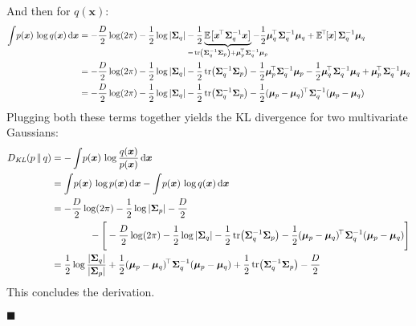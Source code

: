 \documentclass[11pt, a4paper]{scrartcl}
\newcommand{\E}{\mathbb{E}}
\newcommand{\KL}{D_\mathit{KL}}
\newcommand{\transposed}{{\!\top\!}}
\renewcommand{\vec}[1]{\bm{#1}}
\newcommand{\mat}[1]{\bm{\mathrm{#1}}}
\newcommand{\eot}{\hfill\(\blacksquare\)}
\begin{document}
			And then for \( q(\vec{x}) \):
			\begin{align}
				\int\! p(\vec{x}) \, \log q(\vec{x}) \dd{\vec{x}}
					&= -\frac{D}{2} \log(2\pi) - \frac{1}{2} \log \, \lvert \mat{\Sigma}_q \rvert - \frac{1}{2} \underbrace{\E\big[ \vec{x}^\transposed\, \mat{\Sigma}_q^{-1} \vec{x} \big]}_{\mathclap{=\, \tr(\mat{\Sigma}_q^{-1} \mat{\Sigma}_p) + \vec{\mu}_p^{\transposed\,} \mat{\Sigma}_q^{-1} \vec{\mu}_p}} - \frac{1}{2} \vec{\mu}_q^\transposed\, \mat{\Sigma}_q^{-1} \vec{\mu}_q + \E^\transposed[\vec{x}]\, \mat{\Sigma}_q^{-1} \vec{\mu}_q \\
					&= -\frac{D}{2} \log(2\pi) - \frac{1}{2} \log \, \lvert \mat{\Sigma}_q \rvert - \frac{1}{2} \tr(\mat{\Sigma}_q^{-1} \mat{\Sigma}_p) - \frac{1}{2} \vec{\mu}_p^{\transposed\,} \mat{\Sigma}_q^{-1} \vec{\mu}_p - \frac{1}{2} \vec{\mu}_q^\transposed\, \mat{\Sigma}_q^{-1} \vec{\mu}_q + \vec{\mu}_p^\transposed\, \mat{\Sigma}_q^{-1} \vec{\mu}_q \\
					&= -\frac{D}{2} \log(2\pi) - \frac{1}{2} \log \, \lvert \mat{\Sigma}_q \rvert - \frac{1}{2} \tr(\mat{\Sigma}_q^{-1} \mat{\Sigma}_p) - \frac{1}{2} (\vec{\mu}_p - \vec{\mu}_q)^\transposed\, \mat{\Sigma}_q^{-1} (\vec{\mu}_p - \vec{\mu}_q)
			\end{align}
			Plugging both these terms together yields the KL divergence for two multivariate Gaussians:
			\begin{align}
				\KL(p \,\Vert\, q)
					&= -\int\! p(\vec{x}) \, \log \frac{q(\vec{x})}{p(\vec{x})} \dd{\vec{x}} \\
					&= \int\! p(\vec{x}) \, \log p(\vec{x}) \dd{\vec{x}} - \int\! p(\vec{x}) \, \log q(\vec{x}) \dd{\vec{x}} \\
					&= -\frac{D}{2} \log(2\pi) - \frac{1}{2} \log \, \lvert \mat{\Sigma}_p \rvert - \frac{D}{2} \\&\qquad\qquad
						- \Bigg[ -\frac{D}{2} \log(2\pi) - \frac{1}{2} \log \, \lvert \mat{\Sigma}_q \rvert - \frac{1}{2} \tr(\mat{\Sigma}_q^{-1} \mat{\Sigma}_p) - \frac{1}{2} (\vec{\mu}_p - \vec{\mu}_q)^\transposed\, \mat{\Sigma}_q^{-1} (\vec{\mu}_p - \vec{\mu}_q) \Bigg] \\
					&= \frac{1}{2} \log \frac{\lvert \mat{\Sigma}_q \rvert}{\lvert \mat{\Sigma}_p \rvert} + \frac{1}{2} (\vec{\mu}_p - \vec{\mu}_q)^\transposed\, \mat{\Sigma}_q^{-1} (\vec{\mu}_p - \vec{\mu}_q) + \frac{1}{2} \tr(\mat{\Sigma}_q^{-1} \mat{\Sigma}_p) - \frac{D}{2}
			\end{align}
			This concludes the derivation.

			\eot
\end{document}
